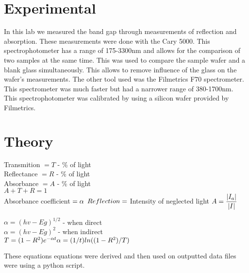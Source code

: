 \documentclass[10pt,a4paper]{article}
\begin{document}
\section*{Experimental}
\begin{indentPar}{1cm}
In this lab we measured the band gap through measurements of reflection and absorption. These measurements were done with the Cary 5000. This spectrophotometer has a range of 175-3300nm \cite{carry} and allows for the comparison of two samples at the same time. This was used to compare the sample wafer and a blank glass simultaneously. This allows to remove influence of the glass on the wafer's measurements. The other tool used was the Filmetrics F70 spectrometer. This spectrometer was much faster but had a narrower range of 380-1700nm. This spectrophotometer was calibrated by using a silicon wafer provided by Filmetrics.\\



\end{indentPar}


\section*{Theory}
\begin{indentPar}{1cm}
\begin{indentPar}{1cm}
Transmition $= T$ - \% of light 
\\Reflectance $= R$ - \% of light
\\Absorbance  $= A $  - \% of light
\\$A+T+R = 1$
 \\Absorbance coefficient $= \alpha \\ $
 $\\Reflection =$ Intensity of neglected light
$\\A= \dfrac{|I_a|}{|I|}$

 $\alpha =(hv-Eg)^{1/2}$ - when direct \cite{tauc}
 \\$\alpha =(hv-Eg)^{2}$ - when indirect \cite{tauc}
 \\$T = (1-R^2)e^{-\alpha t}
 \\ \alpha = (1/t)ln((1-R^2)/T)$
\\
\end{indentPar}

These equations equations were derived and then used on outputted data files were using a python script. 
\end{indentPar}
\end{document}
